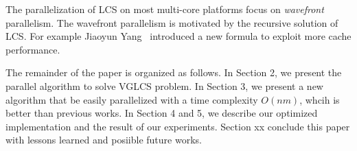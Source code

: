 The parallelization of LCS on most multi-core platforms focus on {\em
  wavefront} parallelism.  The wavefront parallelism is motivated by
the recursive solution of LCS.  For example Jiaoyun
Yang~\cite{Yang2010AnEP} introduced a new formula to exploit more
cache performance. %

\iffalse 在約束條件下的 LCS 中，如 \emph{fixed gap LCS } (FGLCS)要求任
兩個挑選的距離在相對應的另一個字串中相等，同時距離最大為 $k+1$，可在時
間複雜度在 $O(nm)$ 內解決，其中 $n$, $m$ 分別為兩個輸入的字串長度。我
們將在這篇論文針對 \emph{variable gap LCS} (VGLCS) 進行探討。在 VGLCS
中，對各個不同的位置提供約束限制，如目前給定兩個字串 $A =
\tt{GCGCAATG}$, $B = \tt{GCCCTAGCG}$，各自的約束限制為 $G_A = [3, 1,
  1, 2, 0, 0, 2, 1]$ 和 $G_B = [2, 0, 3, 2, 0, 1, 2, 0, 1]$，其中
$G_A(i)$ 表示當挑選第 $i$ 個位置時，與前一個挑選的位置最多差
$G_A(i)+1$，同理 $G_B(i)$；我們可以得到兩組 VGLCS 的解
$\tt{G..C..C..A}$ 和 $\tt{G..C..C..T}$，挑選的方式如圖
~\ref{fig:VGLCSex}。在 Yung-Hsing Peng ~\cite{yunghsing} 的論文已對
VGLCS 提出易於實作的 $O(nm \alpha(n))$ 和理論 $O(nm)$ 的解法。\fi


The remainder of the paper is organized as follows.  In Section 2, we
present the parallel algorithm to solve VGLCS problem.  In Section 3,
we present a new algorithm that be easily parallelized with a time
complexity $O(nm)$, whcih is better than previous works.  In Section 4
and 5, we describe our optimized implementation and the result of our
experiments.  Section xx conclude this paper with lessons learned and
posiible future works.

\iffalse 這一篇論文，我們將在第二 \ref{sec:parallelSerial} 節部分將
Yung-Hsing Peng ~\cite{yunghsing} 提出的算法進行平行化。在第三節
~\ref{sec:parallelRMQ}，在理論分析上提供易平行且時間複雜度 $O(nm)$ 的
設計。在第四節 ~\ref{sec:Implementation}，我們將藉由快取忘卻
(cache-oblivious) 技術，在實作上提供更好的效能。最後，我們總結實驗結果
與理論實務上的差異。\fi

